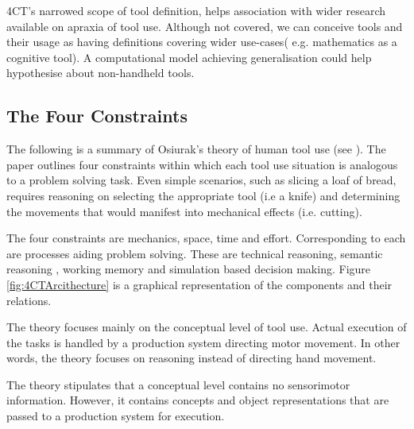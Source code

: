 \documentclass[11]{article}
\begin{document}
4CT's narrowed scope of tool definition, helps association with wider research available on apraxia of tool use. Although not covered,  we can conceive tools and their usage as having definitions covering wider use-cases( e.g. mathematics as a cognitive tool). A computational model achieving generalisation could help hypothesise about non-handheld tools.

\subsection{The Four Constraints}
The following is a summary of Osiurak's theory of human tool use (see \cite{osiurak2014}). 
The paper outlines four constraints within which each tool use situation is analogous to a problem solving task. Even simple scenarios, such as slicing a loaf of bread, requires reasoning on selecting the appropriate tool (i.e a knife) and determining the movements that would manifest into mechanical effects (i.e. cutting). 

The four constraints are mechanics, space, time and effort. 
Corresponding to each are processes aiding problem solving. These are technical reasoning, semantic reasoning , working memory and simulation based decision making. Figure \ref{fig:4CTArcithecture} is a graphical representation of the components and their relations. 

The theory focuses mainly on the conceptual level of tool use. Actual execution of the tasks is handled by a production system directing motor movement. In other words, the theory focuses on reasoning instead of directing hand movement. 

The theory stipulates that a conceptual level contains no sensorimotor information. However, it contains concepts and object representations that are passed to a production system for execution.
\end{document}
